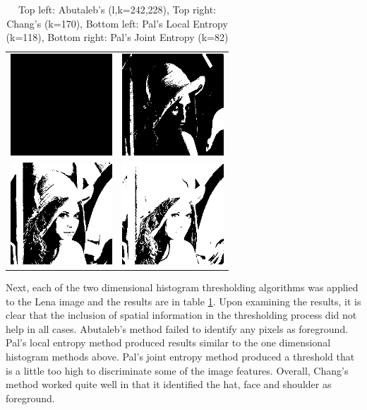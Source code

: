 \documentclass[journal]{IEEEtran}
\begin{document}
\begin{table}[!h]
\centering
\begin{tabular}{cc}
\includegraphics[width=1.5in]{../results/lena_gray_256_abutaleb.png} &
\includegraphics[width=1.5in]{../results/lena_gray_256_chang.png} \\
\newline
\includegraphics[width=1.5in]{../results/lena_gray_256_le_pal.png} &
\includegraphics[width=1.5in]{../results/lena_gray_256_je_pal.png} \\
\end{tabular}
\caption{Top left: Abutaleb's (l,k=242,228), Top right: Chang's (k=170), Bottom left: Pal's Local Entropy (k=118), Bottom right: Pal's Joint Entropy (k=82)}
\label{tab:lenaTable2}
\end{table}

\par Next, each of the two dimensional histogram thresholding algorithms was applied to the Lena image and the results are in table \ref{tab:lenaTable2}. Upon examining the results, it is clear that the inclusion of spatial information in the thresholding process did not help in all cases. Abutaleb's method failed to identify any pixels as foreground. Pal's local entropy method produced results similar to the one dimensional histogram methods above. Pal's joint entropy method produced a threshold that is a little too high to discriminate some of the image features. Overall, Chang's method worked quite well in that it identified the hat, face and shoulder as foreground.
\end{document}
